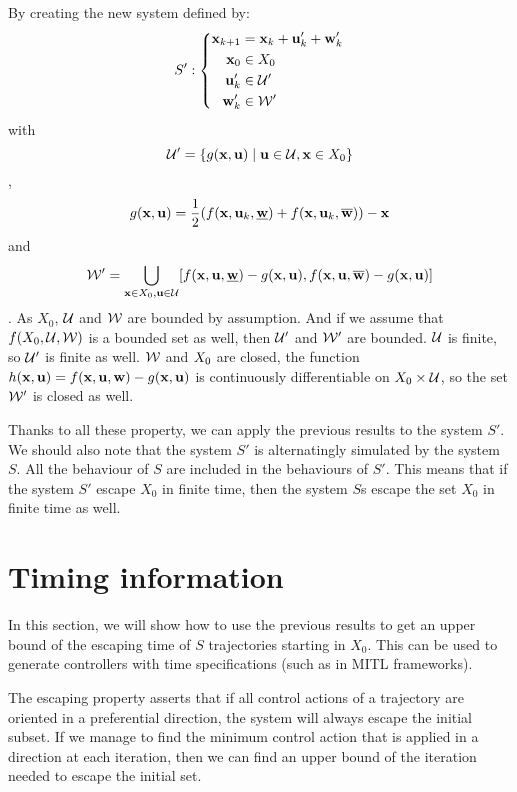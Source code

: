 By creating the new system defined by:
\begin{equation}
S':\left\{
\begin{split}
 \mathbf{x}_{k+1} &=  \mathbf{x}_k +  \mathbf{u}_k' +  \mathbf{w}_k'\\
 \mathbf{x}_0 &\in X_0\\
 \mathbf{u}_k' &\in \mathcal{U}'\\
 \mathbf{w}_k' &\in \mathcal{W}'\\
\end{split}
\right.
\end{equation}
with 
$$\mathcal{U}' = \{ g( \mathbf{x}, \mathbf{u}) \mid  \mathbf{u} \in \mathcal{U},  \mathbf{x} \in X_0\}$$,
$$g( \mathbf{x}, \mathbf{u}) = \frac{1}{2}(f( \mathbf{x}, \mathbf{u}_k,\underline{ \mathbf{w}})+f( \mathbf{x}, \mathbf{u}_k,\overline{ \mathbf{w}})) - \mathbf{x}$$
and 
$$\mathcal{W}' = \bigcup_{ \mathbf{x} \in X_0, \mathbf{u} \in \mathcal{U}} [f( \mathbf{x}, \mathbf{u},\underline{ \mathbf{w}})-g( \mathbf{x}, \mathbf{u}),f( \mathbf{x}, \mathbf{u},\overline{ \mathbf{w}})-g( \mathbf{x}, \mathbf{u})]$$.
As $X_0$, $\mathcal{U}$ and $\mathcal{W}$ are bounded by assumption. And if we assume that $f(X_0,\mathcal{U},\mathcal{W})$ is a bounded set as well, then $\mathcal{U}'$ and $\mathcal{W}'$ are bounded. $\mathcal{U}$ is finite, so $\mathcal{U}'$ is finite as well. $\mathcal{W}$ and $X_0$ are closed, the function $h( \mathbf{x}, \mathbf{u}) = f( \mathbf{x}, \mathbf{u}, \mathbf{w}) - g( \mathbf{x}, \mathbf{u})$ is continuously differentiable on $X_0\times\mathcal{U}$, so the set $\mathcal{W}'$ is closed as well.

Thanks to all these property, we can apply the previous results to the system $S'$. 
We should also note that the system $S'$ is alternatingly simulated by the system $S$. All the behaviour of $S$ are included in the behaviours of $S'$. This means that if the system $S'$ escape $X_0$ in finite time, then the system $S$s escape the set $X_0$ in finite time as well.

\section{Timing  information}\label{sec_timing}
In this section, we will show how to use the previous results to get an upper bound of the escaping time of $S$ trajectories starting in $X_0$.
This can be used to generate controllers with time specifications (such as in MITL frameworks).

The escaping property asserts that if all control actions of a trajectory are oriented in a preferential direction, the system will always escape the initial subset.
If we manage to find the minimum control action that is applied in a direction at each iteration, then we can find an upper bound of the iteration needed to escape the initial set.

